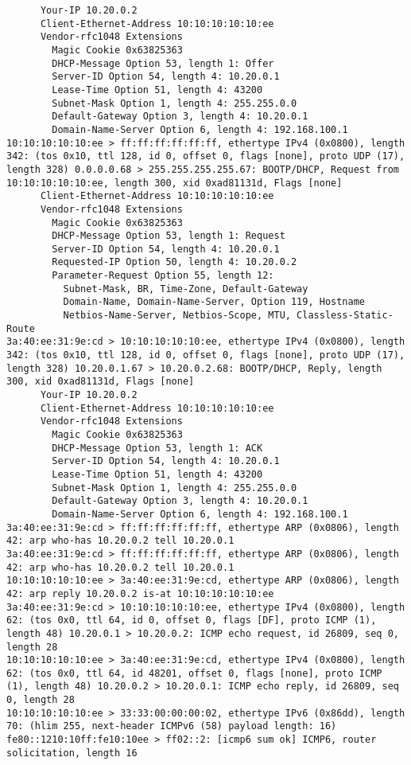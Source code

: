 \documentclass[a4paper,12pt]{article}
\begin{document}
\begin{Verbatim}
	  Your-IP 10.20.0.2
	  Client-Ethernet-Address 10:10:10:10:10:ee
	  Vendor-rfc1048 Extensions
	    Magic Cookie 0x63825363
	    DHCP-Message Option 53, length 1: Offer
	    Server-ID Option 54, length 4: 10.20.0.1
	    Lease-Time Option 51, length 4: 43200
	    Subnet-Mask Option 1, length 4: 255.255.0.0
	    Default-Gateway Option 3, length 4: 10.20.0.1
	    Domain-Name-Server Option 6, length 4: 192.168.100.1
10:10:10:10:10:ee > ff:ff:ff:ff:ff:ff, ethertype IPv4 (0x0800), length 342: (tos 0x10, ttl 128, id 0, offset 0, flags [none], proto UDP (17), length 328) 0.0.0.0.68 > 255.255.255.255.67: BOOTP/DHCP, Request from 10:10:10:10:10:ee, length 300, xid 0xad81131d, Flags [none]
	  Client-Ethernet-Address 10:10:10:10:10:ee
	  Vendor-rfc1048 Extensions
	    Magic Cookie 0x63825363
	    DHCP-Message Option 53, length 1: Request
	    Server-ID Option 54, length 4: 10.20.0.1
	    Requested-IP Option 50, length 4: 10.20.0.2
	    Parameter-Request Option 55, length 12: 
	      Subnet-Mask, BR, Time-Zone, Default-Gateway
	      Domain-Name, Domain-Name-Server, Option 119, Hostname
	      Netbios-Name-Server, Netbios-Scope, MTU, Classless-Static-Route
3a:40:ee:31:9e:cd > 10:10:10:10:10:ee, ethertype IPv4 (0x0800), length 342: (tos 0x10, ttl 128, id 0, offset 0, flags [none], proto UDP (17), length 328) 10.20.0.1.67 > 10.20.0.2.68: BOOTP/DHCP, Reply, length 300, xid 0xad81131d, Flags [none]
	  Your-IP 10.20.0.2
	  Client-Ethernet-Address 10:10:10:10:10:ee
	  Vendor-rfc1048 Extensions
	    Magic Cookie 0x63825363
	    DHCP-Message Option 53, length 1: ACK
	    Server-ID Option 54, length 4: 10.20.0.1
	    Lease-Time Option 51, length 4: 43200
	    Subnet-Mask Option 1, length 4: 255.255.0.0
	    Default-Gateway Option 3, length 4: 10.20.0.1
	    Domain-Name-Server Option 6, length 4: 192.168.100.1
3a:40:ee:31:9e:cd > ff:ff:ff:ff:ff:ff, ethertype ARP (0x0806), length 42: arp who-has 10.20.0.2 tell 10.20.0.1
3a:40:ee:31:9e:cd > ff:ff:ff:ff:ff:ff, ethertype ARP (0x0806), length 42: arp who-has 10.20.0.2 tell 10.20.0.1
10:10:10:10:10:ee > 3a:40:ee:31:9e:cd, ethertype ARP (0x0806), length 42: arp reply 10.20.0.2 is-at 10:10:10:10:10:ee
3a:40:ee:31:9e:cd > 10:10:10:10:10:ee, ethertype IPv4 (0x0800), length 62: (tos 0x0, ttl 64, id 0, offset 0, flags [DF], proto ICMP (1), length 48) 10.20.0.1 > 10.20.0.2: ICMP echo request, id 26809, seq 0, length 28
10:10:10:10:10:ee > 3a:40:ee:31:9e:cd, ethertype IPv4 (0x0800), length 62: (tos 0x0, ttl 64, id 48201, offset 0, flags [none], proto ICMP (1), length 48) 10.20.0.2 > 10.20.0.1: ICMP echo reply, id 26809, seq 0, length 28
10:10:10:10:10:ee > 33:33:00:00:00:02, ethertype IPv6 (0x86dd), length 70: (hlim 255, next-header ICMPv6 (58) payload length: 16) fe80::1210:10ff:fe10:10ee > ff02::2: [icmp6 sum ok] ICMP6, router solicitation, length 16

\end{Verbatim}
\end{document}
